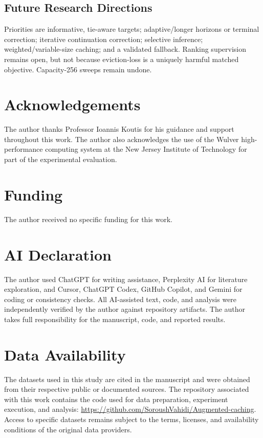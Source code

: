 \documentclass[preprint,12pt]{elsarticle}
\begin{document}
\subsection{Future Research Directions}
\label{subsec:future_research}

Priorities are informative, tie-aware targets; adaptive/longer horizons or terminal correction; iterative continuation correction; selective inference; weighted/variable-size caching; and a validated fallback. Ranking supervision remains open, but not because eviction-loss is a uniquely harmful matched objective. Capacity-256 sweeps remain undone.

\section*{Acknowledgements}

The author thanks Professor Ioannis Koutis for his guidance and support throughout this work. The author also acknowledges the use of the Wulver high-performance computing system at the New Jersey Institute of Technology for part of the experimental evaluation.

\section*{Funding}

The author received no specific funding for this work.

\section*{AI Declaration}

The author used ChatGPT for writing assistance, Perplexity AI for literature exploration, and Cursor, ChatGPT Codex, GitHub Copilot, and Gemini for coding or consistency checks. All AI-assisted text, code, and analysis were independently verified by the author against repository artifacts. The author takes full responsibility for the manuscript, code, and reported results.

\section*{Data Availability}

The datasets used in this study are cited in the manuscript and were obtained from their respective public or documented sources. The repository associated with this work contains the code used for data preparation, experiment execution, and analysis:
\url{https://github.com/SoroushVahidi/Augmented-caching}.
Access to specific datasets remains subject to the terms, licenses, and availability conditions of the original data providers.
\end{document}
